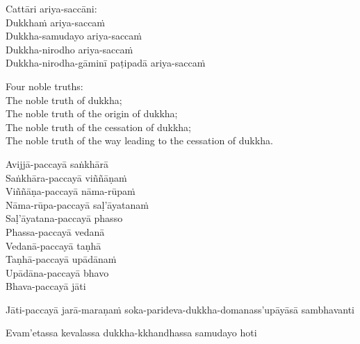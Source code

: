 \suttaRef{[Vibh]}

\begin{pali-hang-continued}
  Cattāri ariya-saccāni:\\
  Dukkhaṁ ariya-saccaṁ\\
  Dukkha-samudayo ariya-saccaṁ\\
  Dukkha-nirodho ariya-saccaṁ\\
  Dukkha-nirodha-gāminī paṭipadā ariya-saccaṁ
\end{pali-hang-continued}

\begin{english-verses}
  Four noble truths:\\
  The noble truth of dukkha;\\
  The noble truth of the origin of dukkha;\\
  The noble truth of the cessation of dukkha;\\
  The noble truth of the way leading to the cessation of dukkha.
\end{english-verses}

\suttaRef{[SN 56.24]}

\begin{pali-hang-continued}
  Avijjā-paccayā saṅkhārā\\
  Saṅkhāra-paccayā viññāṇaṁ\\
  Viññāṇa-paccayā nāma-rūpaṁ\\
  Nāma-rūpa-paccayā saḷ'āyatanaṁ\\
  Saḷ'āyatana-paccayā phasso\\
  Phassa-paccayā vedanā\\
  Vedanā-paccayā taṇhā\\
  Taṇhā-paccayā upādānaṁ\\
  Upādāna-paccayā bhavo\\
  Bhava-paccayā jāti\\
  \begin{pali-hangtogether}
    Jāti-paccayā jarā-maraṇaṁ soka-parideva-dukkha-domanass'upāyāsā sambhavanti
  \end{pali-hangtogether}
  \begin{pali-hangtogether}
    Evam'etassa kevalassa dukkha-kkhandhassa samudayo hoti
  \end{pali-hangtogether}
\end{pali-hang-continued}

